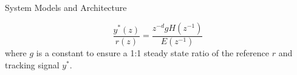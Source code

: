 \begin{section}{System Models and Architecture}
	



	\begin{equation}
	\label{eq:reference model_z}
	\frac{y^*(z)}{r(z)}=\frac{z^{-d}gH(z^{-1})}{E(z^{-1})}
	\end{equation}
where $g$ is a constant to ensure a 1:1 steady state ratio of the reference $r$ and tracking signal $y^*$. 



\end{section}